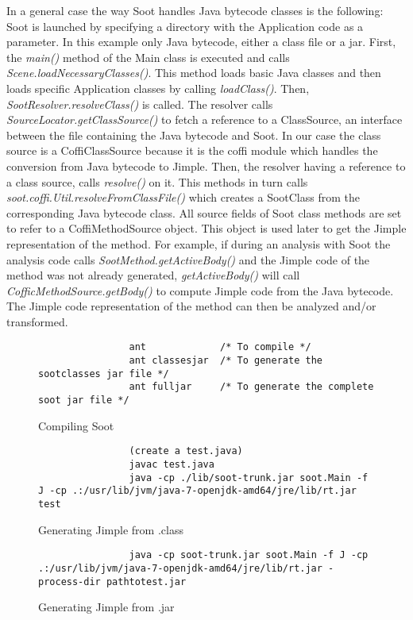 \documentclass{dithesis}
\begin{document}
        In a general case the way Soot handles Java bytecode classes is the following: Soot is launched by specifying a directory with the Application code as a parameter. In this example only Java bytecode, either a class file or a jar. 
        First, the \textit{main()} method of the Main class is executed and calls \textit{Scene.loadNecessaryClasses()}. This method loads basic Java classes and then loads specific Application classes by calling \textit{loadClass()}. Then, \textit{SootResolver.resolveClass()} is called. The resolver calls \textit{SourceLocator.getClassSource()} to fetch a reference to a ClassSource, an interface between the file containing the Java bytecode and Soot. In our case the class source is a CoffiClassSource because it is the coffi module which handles the conversion from Java bytecode to Jimple. Then, the resolver having a reference to a class source, calls \textit{resolve()} on it. This methods in turn calls \textit{soot.coffi.Util.resolveFromClassFile()} which creates a SootClass from the corresponding Java bytecode class. All source fields of Soot class methods are set to refer to a CoffiMethodSource object. This object is used later to get the Jimple representation of the method. For example, if during an analysis with Soot the analysis code calls \textit{SootMethod.getActiveBody()} and the Jimple code of the method was not already generated, \textit{getActiveBody()} will call \textit{CofficMethodSource.getBody()} to compute Jimple code from the Java bytecode. The Jimple code representation of the method can then be analyzed and/or transformed.

        \begin{figure}[H]
            \begin{lstlisting}
                ant             /* To compile */
                ant classesjar  /* To generate the sootclasses jar file */
                ant fulljar     /* To generate the complete soot jar file */
            \end{lstlisting}
        \caption{Compiling Soot}
        \end{figure}
        \begin{figure}[H]
            \begin{lstlisting}
                (create a test.java)
                javac test.java
                java -cp ./lib/soot-trunk.jar soot.Main -f J -cp .:/usr/lib/jvm/java-7-openjdk-amd64/jre/lib/rt.jar test
            \end{lstlisting}
        \caption{Generating Jimple from .class}
        \end{figure}
        \begin{figure}[H]
            \begin{lstlisting}
                java -cp soot-trunk.jar soot.Main -f J -cp .:/usr/lib/jvm/java-7-openjdk-amd64/jre/lib/rt.jar -process-dir pathtotest.jar
            \end{lstlisting}
        \caption{Generating Jimple from .jar}
        \end{figure}
\end{document}
